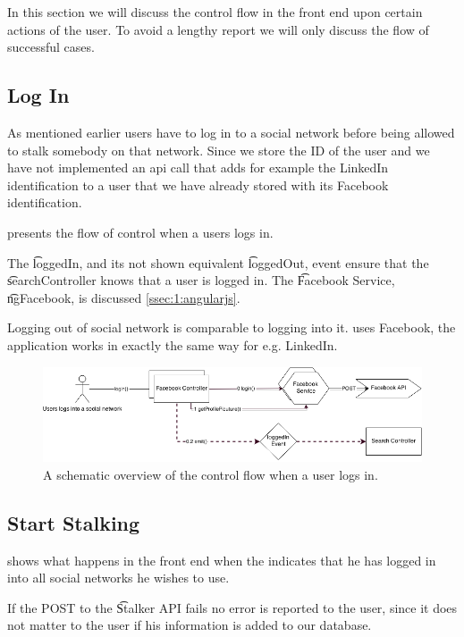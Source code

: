 In this section we will discuss the control flow in the front end upon certain actions of the user. To avoid a lengthy report we will only discuss the flow of successful cases.


\subsection{Log In}
\label{ss:1:login}
	As mentioned earlier users have to log in to a social network before being allowed to stalk somebody on that network. Since we store the ID of the user and we have not implemented an api call that adds for example the LinkedIn identification to a user that we have already stored with its Facebook identification.

	 presents the flow of control when a users logs in.

	The \t{loggedIn}, and its not shown equivalent \t{loggedOut}, event ensure that the \t{searchController} knows that a user is logged in. The \t{Facebook Service}, \t{ngFacebook}, is discussed \vref{ssec:1:angularjs}. 

	Logging out of social network is comparable to logging into it.  uses Facebook, the application works in exactly the same way for e.g. LinkedIn.

	\begin{figure}
		\includegraphics[width=\textwidth]{./img/1_login_flow}
		\caption{A schematic overview of the control flow when a user logs in.}
		\label{fig:1:controlflowLogIn}
	\end{figure}	

\subsection{Start Stalking}
\label{ss:1:startStalking}
	 shows what happens in the front end when the indicates that he has logged in into all social networks he wishes to use. 
	
	If the POST to the \t{Stalker API} fails no error is reported to the user, since it does not matter to the user if his information is added to our database. 

